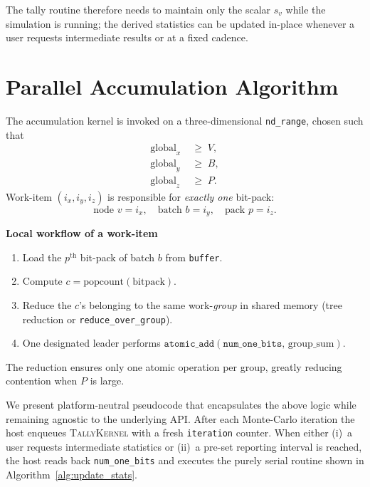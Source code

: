 The tally routine therefore needs to maintain only the scalar
\(s_v\) while the simulation is running; the derived statistics can be updated
in-place whenever a user requests intermediate results or at a fixed cadence.

\section{Parallel Accumulation Algorithm}

The accumulation kernel is invoked on a three-dimensional
\texttt{nd\_range}, chosen such that
\[
  \begin{aligned}
    \text{global}_x &\;\ge\; V,\\
    \text{global}_y &\;\ge\; B,\\
    \text{global}_z &\;\ge\; P.
  \end{aligned}
\]
Work-item \((i_x,i_y,i_z)\) is responsible for \emph{exactly one} bit-pack:
\[
  \text{node  } v=i_x,\quad
  \text{batch } b=i_y,\quad
  \text{pack  } p=i_z.
\]

\vspace{4pt}
\noindent
\textbf{Local workflow of a work-item}
\begin{enumerate}
    \item Load the \(p^{\text{th}}\) bit-pack of batch \(b\) from
          \texttt{buffer}.
    \item Compute \(c=\mathrm{popcount}(\text{bitpack})\).
    \item Reduce the \(c\)'s belonging to the same work-\emph{group} in
          shared memory (tree reduction or \texttt{reduce\_over\_group}).
    \item One designated leader performs
          \(\texttt{atomic\_add}(\texttt{num\_one\_bits},\,\text{group\_sum})\).
\end{enumerate}

The reduction ensures only one atomic operation per group, greatly reducing
contention when \(P\) is large.

We present platform-neutral pseudocode that encapsulates the above logic while remaining agnostic to the underlying API. After each Monte-Carlo iteration the host enqueues \textsc{TallyKernel} with a
fresh \texttt{iteration} counter.  When either (i)~a user requests
intermediate statistics or (ii)~a pre-set reporting interval is reached,
the host reads back \texttt{num\_one\_bits} and executes the purely
serial routine shown in Algorithm~\ref{alg:update_stats}.

